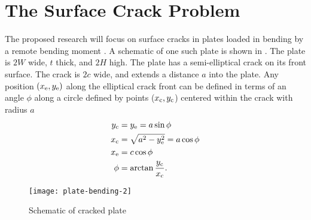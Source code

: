 \section{The Surface Crack Problem}

  The proposed research will focus on surface cracks in plates loaded
  in bending by a remote bending moment \M.
A schematic of one such plate is shown in .
The plate is \(2W\) wide, 
\(t\) thick, and \(2H\) high.
The plate has a semi-elliptical crack on its front surface.
The crack is \(2c\) wide, and extends a distance \(a\) into the plate.
Any position \((x_\textnormal{e}, y_\textnormal{e})\) along the elliptical crack front can be defined in terms of an angle \(\phi\) along a circle defined by points (\(x_\textnormal{c}, y_\textnormal{c}\)) centered within the crack with radius \(a\)
\begin{align*}
      y_\textnormal{c} &= y_\textnormal{e} = a \sin \phi \\
      x_\textnormal{c} &= \sqrt{ a^2 - y_\textnormal{e}^2 } = a \cos \phi \\
      x_\textnormal{e} &= c \cos \phi \\
                  \phi &= \arctan \frac{y_\textnormal{c}}{x_\textnormal{c}} .\\
\end{align*}
  \begin{figure}[tbp]
  \centering
    \texttt{[image: plate-bending-2]}
    \caption{Schematic of cracked plate \label{fig:cracked-plate}}
  \end{figure}

